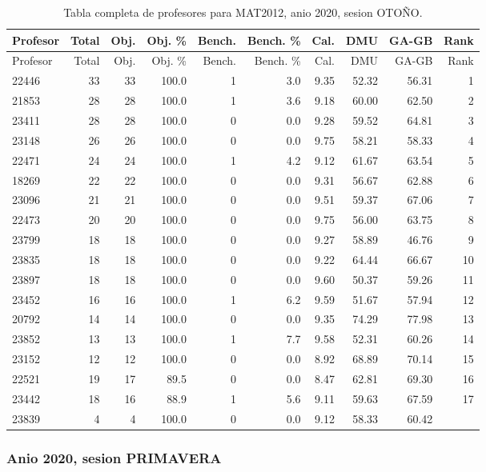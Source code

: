 \begingroup
\scriptsize
\setlength{\tabcolsep}{3pt}
\begin{longtable}{lrrrrrrrrr}
\caption{Tabla completa de profesores para MAT2012, anio 2020, sesion OTOÑO.}\label{tab:prof-period-mat2012-2020-oto-o}\\
\toprule
Profesor & Total & Obj. & Obj. \% & Bench. & Bench. \% & Cal. & DMU & GA-GB & Rank \\
\midrule
\endfirsthead
\toprule
Profesor & Total & Obj. & Obj. \% & Bench. & Bench. \% & Cal. & DMU & GA-GB & Rank \\
\midrule
\endhead
22446 & 33 & 33 & 100.0 & 1 & 3.0 & 9.35 & 52.32 & 56.31 & 1 \\
21853 & 28 & 28 & 100.0 & 1 & 3.6 & 9.18 & 60.00 & 62.50 & 2 \\
23411 & 28 & 28 & 100.0 & 0 & 0.0 & 9.28 & 59.52 & 64.81 & 3 \\
23148 & 26 & 26 & 100.0 & 0 & 0.0 & 9.75 & 58.21 & 58.33 & 4 \\
22471 & 24 & 24 & 100.0 & 1 & 4.2 & 9.12 & 61.67 & 63.54 & 5 \\
18269 & 22 & 22 & 100.0 & 0 & 0.0 & 9.31 & 56.67 & 62.88 & 6 \\
23096 & 21 & 21 & 100.0 & 0 & 0.0 & 9.51 & 59.37 & 67.06 & 7 \\
22473 & 20 & 20 & 100.0 & 0 & 0.0 & 9.75 & 56.00 & 63.75 & 8 \\
23799 & 18 & 18 & 100.0 & 0 & 0.0 & 9.27 & 58.89 & 46.76 & 9 \\
23835 & 18 & 18 & 100.0 & 0 & 0.0 & 9.22 & 64.44 & 66.67 & 10 \\
23897 & 18 & 18 & 100.0 & 0 & 0.0 & 9.60 & 50.37 & 59.26 & 11 \\
23452 & 16 & 16 & 100.0 & 1 & 6.2 & 9.59 & 51.67 & 57.94 & 12 \\
20792 & 14 & 14 & 100.0 & 0 & 0.0 & 9.35 & 74.29 & 77.98 & 13 \\
23852 & 13 & 13 & 100.0 & 1 & 7.7 & 9.58 & 52.31 & 60.26 & 14 \\
23152 & 12 & 12 & 100.0 & 0 & 0.0 & 8.92 & 68.89 & 70.14 & 15 \\
22521 & 19 & 17 & 89.5 & 0 & 0.0 & 8.47 & 62.81 & 69.30 & 16 \\
23442 & 18 & 16 & 88.9 & 1 & 5.6 & 9.11 & 59.63 & 67.59 & 17 \\
23839 & 4 & 4 & 100.0 & 0 & 0.0 & 9.12 & 58.33 & 60.42 &  \\
\bottomrule
\end{longtable}
\endgroup

\subsubsection{Anio 2020, sesion PRIMAVERA}

